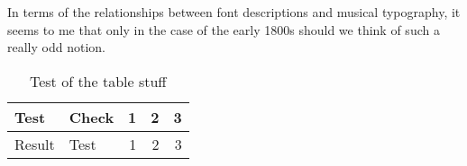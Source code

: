 \documentclass[10pt,stdletter,faxheaderpage]{newlfm}
\begin{document}
\begin{newlfm}
  In terms of the relationships between font
  descriptions and musical typography, it seems to
  me that only in the case of the early 1800s
  should we think of such a really odd notion.

  \begin{table}[htbp]
    \begin{center}
      \begin{tabular}{|l|lrrr|} \hline
      Test & Check & 1 & 2 & 3 \\ 
      \hline
      Result & Test & 1 & 2 & 3 \\ \hline
      \end{tabular}
      \caption{Test of the table stuff}
      \label{tab:test}
    \end{center}
  \end{table}
\end{newlfm}
\end{document}
